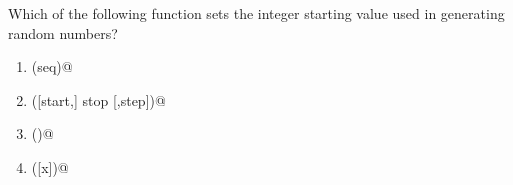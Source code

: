 \question
Which of the following function sets the integer starting value used in generating random numbers?

\begin{enumerate}
\item \lstinline@choice(seq)@
\item \lstinline@randrange ([start,] stop [,step])@
\item \lstinline@random()@
\item \lstinline@seed([x])@
\end{enumerate}

